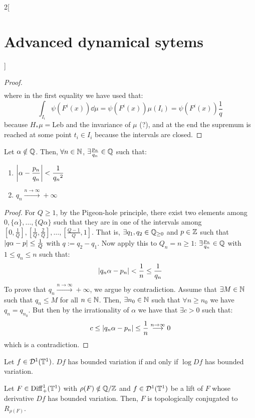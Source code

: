 \documentclass[../../../main_math.tex]{subfiles}
\begin{document}
\begin{multicols}{2}[\section{Advanced dynamical sytems}]
\begin{proof}
\begin{multline*}
    \end{multline*}
    where in the first equality we have used that:
    $$
      \int_{I_i}\psi(F^i(x))\dd{\mu}=\psi(F^i(x))\mu(I_i)=\psi(F^i(x))\frac{1}{q}
    $$
    because $H_*\mu = \text{Leb}$ and the invariance of $\mu$ (?), and at the end the supremum is reached at some point $t_i\in I_i$ because the intervals are closed.
  \end{proof}
  \begin{lemma}\label{ADS:lema_pnqn}
    Let $\alpha\notin\mathbb{Q}$. Then, $\forall n\in\mathbb{N}$, $\exists \frac{p_n}{q_n}\in\mathbb{Q}$ such that:
    \begin{enumerate}
      \item $\displaystyle\abs{\alpha-\frac{p_n}{q_n}}<\frac{1}{{q_n}^2}$
      \item $q_n\overset{n\to\infty}{\longrightarrow}+\infty$
    \end{enumerate}
  \end{lemma}
  \begin{proof}
    For $Q\geq 1$, by the Pigeon-hole principle, there exist two elements among $0,\{\alpha\},\ldots,\{Q \alpha\}$ such that they are in one of the intervals among $[0,\frac{1}{Q}], [\frac{1}{Q},\frac{2}{Q}],\ldots,[\frac{Q-1}{Q},1]$. That is, $\exists q_1,q_2\in\mathbb{Q}_{\geq 0}$ and $p\in\mathbb{Z}$ such that $\abs{q\alpha -p}\leq \frac{1}{Q}$ with $q:=q_2-q_1$. Now apply this to $Q_n=n\geq 1$: $\exists \frac{p_n}{q_n}\in \mathbb{Q}$ with $1\leq q_n\leq n$ such that:
    $$
      \abs{q_n\alpha-p_n}<\frac{1}{n}\leq \frac{1}{q_n}
    $$
    To prove that $q_n\overset{n\to\infty}{\longrightarrow}+\infty$, we argue by contradiction. Assume that $\exists M\in\mathbb{N}$ such that $q_n\leq M$ for all $n\in\mathbb{N}$. Then, $\exists n_0\in\mathbb{N}$ such that $\forall n\geq n_0$ we have $q_n=q_{n_0}$. But then by the irrationality of $\alpha$ we have that $\exists c>0$ such that:
    $$
      c\leq \abs{q_n\alpha-p_n}\leq \frac{1}{n} \overset{n\to\infty}{\longrightarrow} 0
    $$
    which is a contradiction.
  \end{proof}
  \begin{lemma}\label{ADS:lema_var_log}
    Let $f\in \mathcal{D}^1(\mathbb{T}^1)$. $Df$ has bounded variation if and only if $\log Df$ has bounded variation.
  \end{lemma}
  \begin{theorem}
    Let $F\in \mathrm{Diff}_+^1(\mathbb{T}^1)$ with $\rho(F)\notin\quot{\QQ}{\ZZ}$ and $f\in\mathcal{D}^1(\mathbb{T}^1)$ be a lift of $F$ whose derivative $Df$ has bounded variation. Then, $F$ is topologically conjugated to $R_{\rho(F)}$.

\end{theorem}
\end{multicols}
\end{document}
